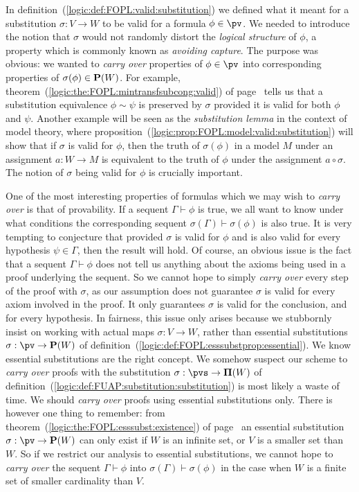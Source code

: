 In definition~(\ref{logic:def:FOPL:valid:substitution}) we defined
what it meant for a substitution $\sigma:V\to W$ to be valid for a
formula $\phi\in\pv$. We needed to introduce the notion that
$\sigma$ would not randomly distort the {\em logical structure} of
$\phi$, a property which is commonly known as {\em avoiding
capture}. The purpose was obvious: we wanted to {\em carry over}
properties of $\phi\in\pv$ into corresponding properties of
$\sigma(\phi)\in{\bf P}(W)$. For example,
theorem~(\ref{logic:the:FOPL:mintransfsubcong:valid}) of
page~\pageref{logic:the:FOPL:mintransfsubcong:valid} tells us that a
substitution equivalence $\phi\sim\psi$ is preserved by $\sigma$
provided it is valid for both $\phi$ and $\psi$. Another example
will be seen as the {\em substitution lemma} in the context of model
theory, where
proposition~(\ref{logic:prop:FOPL:model:valid:substitution}) will
show that if $\sigma$ is valid for $\phi$, then the truth of
$\sigma(\phi)$ in a model $M$ under an assignment $a:W\to M$ is
equivalent to the truth of $\phi$ under the assignment
$a\circ\sigma$. The notion of $\sigma$ being valid for $\phi$ is
crucially important.

One of the most interesting properties of formulas which we may wish
to {\em carry over} is that of provability. If a sequent
$\Gamma\vdash\phi$ is true, we all want to know under what
conditions the corresponding sequent
$\sigma(\Gamma)\vdash\sigma(\phi)$ is also true. It is very tempting
to conjecture that provided $\sigma$ is valid for $\phi$ and is also
valid for every hypothesis $\psi\in\Gamma$, then the result will
hold. Of course, an obvious issue is the fact that a sequent
$\Gamma\vdash\phi$ does not tell us anything about the axioms being
used in a proof underlying the sequent. So we cannot hope to simply
{\em carry over} every step of the proof with $\sigma$, as our
assumption does not guarantee $\sigma$ is valid for every axiom
involved in the proof. It only guarantees $\sigma$ is valid for the
conclusion, and for every hypothesis. In fairness, this issue only
arises because we stubbornly insist on working with actual maps
$\sigma:V\to W$, rather than essential substitutions
$\sigma:\pv\to{\bf P}(W)$ of
definition~(\ref{logic:def:FOPL:esssubstprop:essential}). We know
essential substitutions are the right concept. We somehow suspect
our scheme to {\em carry over} proofs with the substitution
$\sigma:\pvs\to{\bf\Pi}(W)$ of
definition~(\ref{logic:def:FUAP:substitution:substitution}) is most
likely a waste of time. We should {\em carry over} proofs using
essential substitutions only. There is however one thing to
remember: from theorem~(\ref{logic:the:FOPL:esssubst:existence}) of
page~\pageref{logic:the:FOPL:esssubst:existence} an essential
substitution $\sigma:\pv\to{\bf P}(W)$ can only exist if $W$ is an
infinite set, or $V$ is a smaller set than $W$. So if we restrict
our analysis to essential substitutions, we cannot hope to {\em
carry over} the sequent $\Gamma\vdash\phi$ into
$\sigma(\Gamma)\vdash\sigma(\phi)$ in the case when $W$ is a finite
set of smaller cardinality than $V$.

